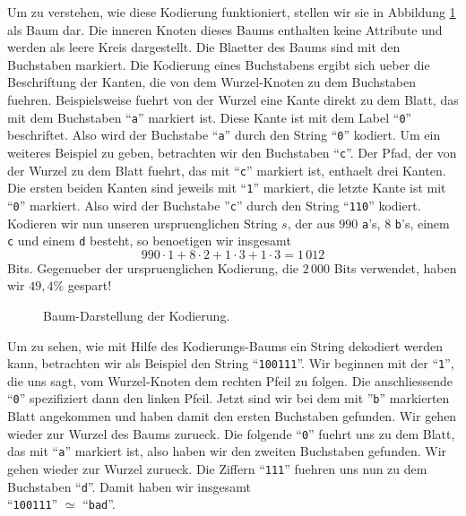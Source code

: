 Um zu verstehen, wie diese Kodierung funktioniert, stellen wir sie in
Abbildung \ref{fig:coding-tree} als Baum dar.  Die inneren 
Knoten dieses Baums enthalten keine Attribute und werden als leere Kreis dargestellt.
Die Blaetter des Baums sind mit den Buchstaben markiert.
Die Kodierung eines Buchstabens ergibt sich ueber die Beschriftung der Kanten, die von dem
Wurzel-Knoten zu dem Buchstaben fuehren.  Beispielsweise fuehrt von der Wurzel eine
Kante direkt zu dem Blatt, das mit dem Buchstaben ``\texttt{a}'' markiert ist.  Diese
Kante ist mit dem Label ``\texttt{0}'' beschriftet.  Also wird der Buchstabe
``\texttt{a}'' durch den String ``\texttt{0}'' kodiert.  Um ein weiteres Beispiel zu
geben, betrachten wir den Buchstaben ``\texttt{c}''.   Der Pfad, der von der Wurzel zu dem
Blatt fuehrt, das mit ``\texttt{c}'' markiert ist, enthaelt drei Kanten.  Die ersten beiden
Kanten sind jeweils mit ``\texttt{1}'' markiert, die letzte Kante ist mit ``\texttt{0}''
markiert.  Also wird der Buchstabe ''\texttt{c}'' durch den String ``\texttt{110}''
kodiert.  Kodieren wir nun unseren urspruenglichen String $s$, der aus $990$
\texttt{a}'s, $8$ \texttt{b}'s, einem \texttt{c} und einem \texttt{d} besteht, so
benoetigen wir insgesamt
\[ 990 \cdot 1 + 8 \cdot 2 + 1 \cdot 3 + 1 \cdot 3 = 1\,012 \]
Bits.  Gegenueber der urspruenglichen Kodierung, die $2\,000$ Bits verwendet, haben wir $49,4\%$
gespart!

\begin{figure}[!ht]
  \centering
  \caption{Baum-Darstellung der Kodierung.}
  \label{fig:coding-tree}
\end{figure}

Um zu sehen, wie mit Hilfe des Kodierungs-Baums ein String dekodiert werden kann,
betrachten wir als Beispiel den String ``\texttt{100111}''.  Wir beginnen mit der
``\texttt{1}'', die uns sagt, vom Wurzel-Knoten dem rechten Pfeil zu folgen.  Die
anschliessende ``\texttt{0}'' spezifiziert dann den linken Pfeil.  Jetzt sind wir bei dem
mit ''\texttt{b}'' markierten Blatt angekommen und haben damit den ersten Buchstaben
gefunden.  Wir gehen wieder zur Wurzel des Baums zurueck. Die folgende ``\texttt{0}'' fuehrt
uns zu dem Blatt, das mit ``\texttt{a}'' markiert ist, also haben wir den zweiten
Buchstaben gefunden. Wir gehen wieder zur Wurzel zurueck.  Die Ziffern ``\texttt{111}''
fuehren uns nun zu dem Buchstaben ``\texttt{d}''.  Damit haben wir insgesamt
\\[0.2cm]
\hspace*{1.3cm}
``\texttt{100111}'' $\simeq$ ``\texttt{bad}''.


